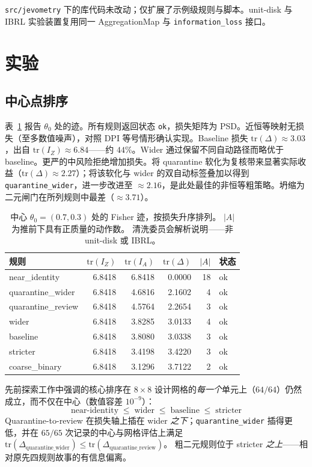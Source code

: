 \documentclass[11pt,a4paper]{article}
\begin{document}
\texttt{src/jevometry} 下的库代码未改动；仅扩展了示例级规则与脚本。unit-disk 与 IBRL 实验装置复用同一 AggregationMap 与 \texttt{information\_loss} 接口。

\section{实验}
\label{sec:experiments}

\subsection{中心点排序}

表~\ref{tab:center} 报告 $\theta_0$ 处的迹。所有规则返回状态 \texttt{ok}，损失矩阵为 PSD。近恒等映射无损失（至多数值噪声），对照 DPI 等号情形确认实现。Baseline 损失 $\mathrm{tr}(\Delta)\approx 3.03$，出自 $\mathrm{tr}(I_Z)\approx 6.84$——约 $44\%$。Wider 通过保留不同自动路径而略优于 baseline。更严的中风险拒绝增加损失。将 quarantine 软化为复核带来显著实际收益（$\mathrm{tr}(\Delta)\approx 2.27$）；将该软化与 wider 的双自动标签叠加以得到 \texttt{quarantine\_wider}，进一步改进至 $\approx 2.16$，是此处最佳的非恒等粗策略。坍缩为二元闸门在所列规则中最差（$\approx 3.71$）。

\begin{table}[t]
\centering
\caption{中心 $\theta_0=(0.7,0.3)$ 处的 Fisher 迹，按损失升序排列。
$|A|$ 为推前下具有正质量的动作数。
清洗委员会解析说明——非 unit-disk 或 IBRL。}
\label{tab:center}
\begin{tabular}{lrrrrl}
\toprule
规则 & $\mathrm{tr}(I_Z)$ & $\mathrm{tr}(I_A)$ & $\mathrm{tr}(\Delta)$ & $|A|$ & 状态 \\
\midrule
near\_identity & 6.8418 & 6.8418 & 0.0000 & 18 & ok \\
quarantine\_wider & 6.8418 & 4.6816 & 2.1602 & 4 & ok \\
quarantine\_review & 6.8418 & 4.5764 & 2.2654 & 3 & ok \\
wider & 6.8418 & 3.8285 & 3.0133 & 4 & ok \\
baseline & 6.8418 & 3.8080 & 3.0338 & 3 & ok \\
stricter & 6.8418 & 3.4198 & 3.4220 & 3 & ok \\
coarse\_binary & 6.8418 & 3.1296 & 3.7122 & 2 & ok \\
\bottomrule
\end{tabular}
\end{table}

先前探索工作中强调的核心排序在 $8\times 8$ 设计网格的\emph{每一个}单元上（$64/64$）仍然成立，而不仅在中心（数值容差 $10^{-9}$）：
\begin{equation*}
  \mathrm{near\text{-}identity}
  \;\le\;
  \mathrm{wider}
  \;\le\;
  \mathrm{baseline}
  \;\le\;
  \mathrm{stricter}
\end{equation*}
Quarantine-to-review 在损失轴上插在 wider \emph{之下}；\texttt{quarantine\_wider} 插得更低，并在 $65/65$ 次记录的中心与网格评估上满足
$\mathrm{tr}(\Delta_{\mathrm{quarantine\_wider}})
\le\mathrm{tr}(\Delta_{\mathrm{quarantine\_review}})$。
粗二元规则位于 stricter \emph{之上}——相对原先四规则故事的有信息偏离。
\end{document}

